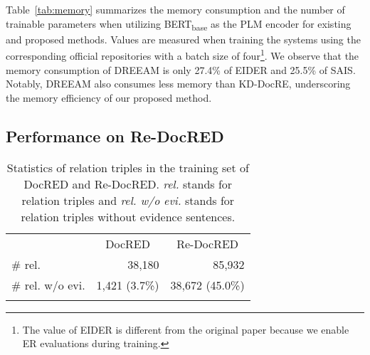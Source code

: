 \documentclass[11pt]{article}
\begin{document}
Table~\ref{tab:memory} summarizes the memory consumption and the number of trainable parameters when utilizing BERT\textsubscript{base} as the PLM encoder for existing and proposed methods.
Values are measured when training the systems using the corresponding official repositories with a batch size of four\footnote{The value of EIDER is different from the original paper because we enable ER evaluations during training.}.
We observe that the memory consumption of DREEAM is only 27.4\% of EIDER and 25.5\% of SAIS.
Notably, DREEAM also consumes less memory than KD-DocRE, underscoring the memory efficiency of our proposed method. 


\subsection{Performance on Re-DocRED}

\begin{table}[!t]
    \centering
    \small
    \begin{tabular}{lrr}
    \Xhline{3\arrayrulewidth}
    \multicolumn{1}{c}{\textbf{Statistics}} & \multicolumn{1}{c}{DocRED} & \multicolumn{1}{c}{Re-DocRED} \\
    \Xhline{2\arrayrulewidth}
    \# rel. & 38,180 & 85,932 \\
    \# rel. w/o evi. & 1,421 (3.7\%) & 38,672 (45.0\%)\\
    \Xhline{3\arrayrulewidth}
    \end{tabular}
    \caption{Statistics of relation triples in the training set of DocRED and Re-DocRED. \textit{rel.} stands for relation triples and \textit{rel. w/o evi.} stands for relation triples without evidence sentences.}
    \label{tab:evi_redocred}
\end{table}
\end{document}
